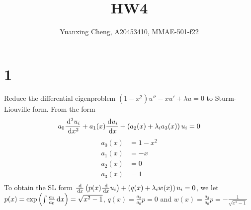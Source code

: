 \documentclass{article}
\title{HW4}
\author{Yuanxing Cheng, A20453410, MMAE-501-f22}
\begin{document}
\maketitle

\section*{1}

\begin{myleftlinebox}
    Reduce the differential eigenproblem \((1-x^2)u''-xu'+\lambda u=0\) to Sturm-Liouville form.
    \tcblower
    From the form
    \[a_0\frac{\,\mathrm{d}^2 u_i}{\,\mathrm{d} x^2} + a_1(x) \frac{\,\mathrm{d} u_i}{\,\mathrm{d} x}+\left( a_2(x)+\lambda_i a_3(x) \right) u_i=0\]
    \begin{align*}
        a_0(x) &= 1-x^2\\
        a_1(x) &= -x\\
        a_2(x) &= 0\\
        a_3(x) &= 1\\
    \end{align*}
    To obtain the SL form \(\frac{\,\mathrm{d}}{\,\mathrm{d} x} \left( p(x)\frac{\,\mathrm{d}}{\,\mathrm{d} x}u_i \right) +\left( q(x)+\lambda_i w(x) \right)u_i=0  \), we let \(p(x)=\exp\left( \int \frac{a_1}{a_0}\,\mathrm{d} x \right)=\sqrt{x^2-1}\), \(q(x)=\frac{a_2}{a_0}p=0\) and \(w(x)=\frac{a_3}{a_0}p=-\frac{1}{\sqrt{x^2-1}}\)
\end{myleftlinebox}
\end{document}
